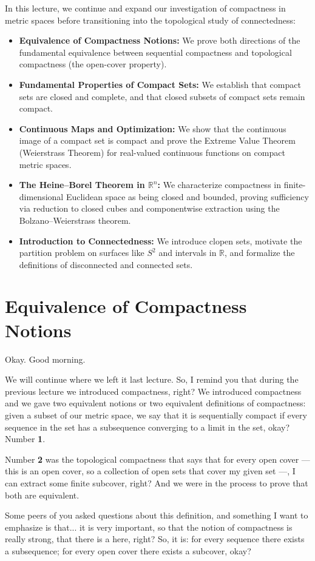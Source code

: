 \begin{overview}
In this lecture, we continue and expand our investigation of compactness in metric spaces before transitioning into the topological study of connectedness:
\begin{itemize}
    \item \textbf{Equivalence of Compactness Notions:} We prove both directions of the fundamental equivalence between sequential compactness and topological compactness (the open-cover property).
    \item \textbf{Fundamental Properties of Compact Sets:} We establish that compact sets are closed and complete, and that closed subsets of compact sets remain compact.
    \item \textbf{Continuous Maps and Optimization:} We show that the continuous image of a compact set is compact and prove the Extreme Value Theorem (Weierstrass Theorem) for real-valued continuous functions on compact metric spaces.
    \item \textbf{The Heine--Borel Theorem in $\mathbb{R}^n$:} We characterize compactness in finite-dimensional Euclidean space as being closed and bounded, proving sufficiency via reduction to closed cubes and componentwise extraction using the Bolzano--Weierstrass theorem.
    \item \textbf{Introduction to Connectedness:} We introduce clopen sets, motivate the partition problem on surfaces like $S^2$ and intervals in $\mathbb{R}$, and formalize the definitions of disconnected and connected sets.
\end{itemize}
\end{overview}

\section{Equivalence of Compactness Notions}

\begin{speech}[00:00:00 - 00:01:45]
Okay. Good morning.

We will continue where we left it last lecture. So, I remind you that during the previous lecture we introduced compactness, right? We introduced compactness and we gave two equivalent notions or two equivalent definitions of compactness: given a subset of our metric space, we say that it is sequentially compact if every sequence in the set has a subsequence converging to a limit in the set, okay? Number \textbf{1}.

Number \textbf{2} was the topological compactness that says that for every open cover --- this is an open cover, so a collection of open sets that cover my given set ---, I can extract some finite subcover, right? And we were in the process to prove that both are equivalent.

Some peers of you asked questions about this definition, and something I want to emphasize is that...  it is very important, so that the notion of compactness is really strong, that there is a  here, right? So, it is: for every sequence there exists a subsequence; for every open cover there exists a subcover, okay?
\end{speech}

